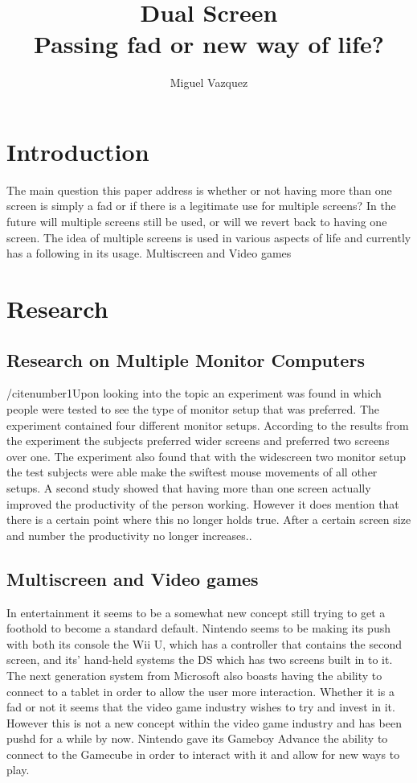 \documentclass[11pt]{article}
\title{\textbf{Dual Screen} \\Passing fad or new way of life?}
\author{Miguel Vazquez}
\begin{document}
\maketitle
\tableofcontents

\section{Introduction}
The main question this paper address is whether or not having more than one screen is simply a fad or if there is a legitimate use for multiple screens? In the future will multiple screens still be used, or will we revert back to having one screen. The idea of multiple screens is used in various aspects of life and currently has a following in its usage.
Multiscreen and Video games

\section{Research}
\subsection{Research on Multiple Monitor Computers}
/cite{number1}Upon looking into the topic an experiment was found in which people were tested to see the type of monitor setup that was preferred. The experiment contained four different monitor setups. According to the results from the experiment the subjects preferred wider screens and preferred two screens over one. The experiment also found that with the widescreen two monitor setup the test subjects were able make the swiftest mouse movements of all other setups. A second study showed that having more than one screen actually improved the productivity of the person working. However it does mention that there is a certain point where this no longer holds true. After a certain screen size and number the productivity no longer increases..

\subsection{Multiscreen and Video games}
In entertainment it seems to be a somewhat new concept still trying to get a foothold to become a standard default. Nintendo seems to be making its push with both its console the Wii U, which has a controller that contains the second screen, and its' hand-held systems the DS which has two  screens built in to it. The next generation system from Microsoft also boasts having the ability to connect to a tablet in order to allow the user more interaction. Whether it is a fad or not it seems that the video game industry wishes to try and invest in it. However this is not a new concept within the video game industry and has been pushd for a while by now. Nintendo gave its Gameboy Advance the ability to connect to the Gamecube in order to interact with it and allow for new ways to play.
\end{document}
